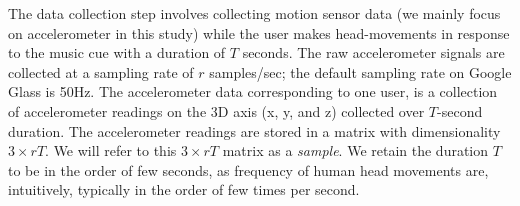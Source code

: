 The data collection step involves collecting motion sensor data (we mainly focus on accelerometer in this study) while the user makes head-movements 
in response to the music cue  with a duration of $T$ seconds.
The raw accelerometer
signals are collected at
a sampling rate of $r$ samples/sec; the default sampling rate on
Google Glass is 50Hz. The accelerometer data corresponding to one user,  is a
collection of accelerometer readings on the
3D axis (x, y, and z) collected over $T$-second duration.
The accelerometer readings are stored in a
matrix with dimensionality $3\times rT$. %
We will refer to this $3\times rT$ matrix as a {\em sample}.
We retain the duration $T$ to be in the order of few seconds, as frequency of
human head movements are, intuitively, typically in the order of few times per
second. %






